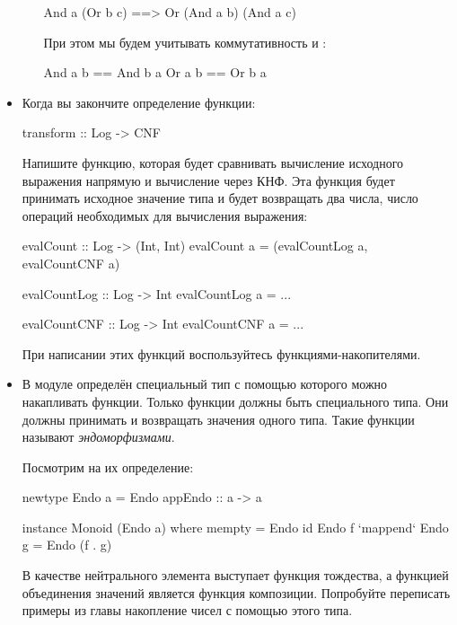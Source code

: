 \begin{itemize}
\begin{itemize}
\begin{code}
And a (Or b c)  ==> Or (And a b) (And a c)
\end{code}

При этом мы будем учитывать коммутативность
 и :

\begin{code}
And a b  == And b a
Or  a b  == Or  b a
\end{code}

\end{itemize}

\item Когда вы закончите определение функции:

\begin{code}
transform :: Log -> CNF
\end{code}

Напишите функцию, которая будет сравнивать
вычисление исходного выражения напрямую
и вычисление через КНФ. Эта функция будет
принимать исходное значение типа 
и будет возвращать два числа, число операций
необходимых для вычисления выражения: 

\begin{code}
evalCount :: Log -> (Int, Int)
evalCount a = (evalCountLog a, evalCountCNF a)

evalCountLog :: Log -> Int
evalCountLog a = ...

evalCountCNF :: Log -> Int
evalCountCNF a = ...
\end{code}

При написании этих функций воспользуйтесь
функциями-накопителями.


\item В модуле  определён специальный
тип с помощью которого можно накапливать функции.
Только функции должны быть специального типа. Они должны
принимать и возвращать значения одного типа. Такие функции
называют \emph{эндоморфизмами}.

Посмотрим на их определение:

\begin{code}
newtype Endo a = Endo { appEndo :: a -> a }

instance Monoid (Endo a) where
        mempty = Endo id
        Endo f `mappend` Endo g = Endo (f . g)
\end{code}

В качестве нейтрального элемента выступает функция тождества,
а функцией объединения значений является функция композиции.
Попробуйте переписать примеры из главы накопление чисел
с помощью этого типа.


\end{itemize}

